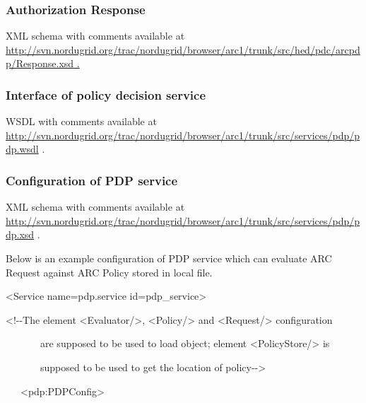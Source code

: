 \documentclass{article}
\newcommand\textstyleInternetlink[1]{\textcolor[rgb]{0.0,0.0,0.5019608}{#1}}
\begin{document}
\subsubsection{Authorization Response}
{\upshape\color{black}
XML schema with comments available at
\href{http://svn.nordugrid.org/trac/nordugrid/browser/arc1/trunk/src/hed/pdc/arcpdp/Request.xsd}{\textstyleInternetlink{http://svn.nordugrid.org/trac/nordugrid/browser/arc1/trunk/src/hed/pdc/arcpdp/Response.xsd}}\href{http://svn.nordugrid.org/trac/nordugrid/browser/arc1/trunk/src/hed/pdc/arcpdp/Policy.xsd}{\textstyleInternetlink{
.}}}

\subsubsection[Interface of policy decision service]{Interface of policy
decision service}
{\upshape\color{black}
WSDL with comments available at
\url{http://svn.nordugrid.org/trac/nordugrid/browser/arc1/trunk/src/services/pdp/pdp.wsdl}
.}

\subsubsection{Configuration of PDP service}
{\upshape\color{black}
XML schema with comments available at
\url{http://svn.nordugrid.org/trac/nordugrid/browser/arc1/trunk/src/services/pdp/pdp.xsd}
.}

{\upshape\color{black}
Below is an example configuration of PDP service which can evaluate ARC
Request against ARC Policy stored in local file.}

{\ttfamily\color{black}
{\textless}Service name={\textquotedbl}pdp.service{\textquotedbl}
id={\textquotedbl}pdp\_service{\textquotedbl}{\textgreater}}

{\ttfamily\color{black}
{\textless}!-{}-The element {\textless}Evaluator/{\textgreater},
{\textless}Policy/{\textgreater} and {\textless}Request/{\textgreater}
configuration}

{\ttfamily\color{black}
\ \ \ \ \ \ \ are supposed to be used to load object; element
{\textless}PolicyStore/{\textgreater} is}

{\ttfamily\color{black}
\ \ \ \ \ \ \ supposed to be used to get the location of
policy-{}-{\textgreater}}

{\ttfamily\color{black}
\ \ \ {\textless}pdp:PDPConfig{\textgreater}}
\end{document}
